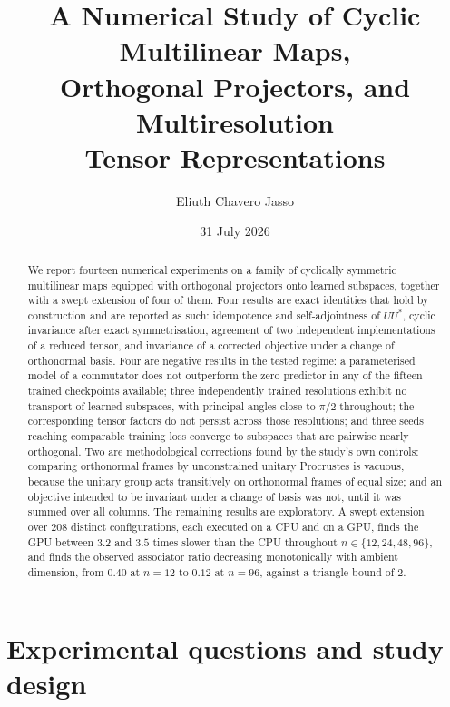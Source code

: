 \documentclass[11pt]{amsart}
\title[A numerical study of cyclic multilinear maps and projectors]{A Numerical Study of Cyclic Multilinear Maps,\\ Orthogonal Projectors, and Multiresolution\\ Tensor Representations}
\author{Eliuth Chavero Jasso}
\date{31 July 2026}
\theoremstyle{remark}
\begin{document}
\maketitle

\begin{abstract}
We report fourteen numerical experiments on a family of cyclically symmetric multilinear
maps equipped with orthogonal projectors onto learned subspaces, together with a swept
extension of four of them. Four results are exact identities that hold by construction and
are reported as such: idempotence and self-adjointness of $UU^{*}$, cyclic invariance
after exact symmetrisation, agreement of two independent implementations of a reduced
tensor, and invariance of a corrected objective under a change of orthonormal basis. Four
are negative results in the tested regime: a parameterised model of a commutator does not
outperform the zero predictor in any of the fifteen trained checkpoints available; three
independently trained resolutions exhibit no transport of learned subspaces, with
principal angles close to $\pi/2$ throughout; the corresponding tensor factors do not
persist across those resolutions; and three seeds reaching comparable training loss
converge to subspaces that are pairwise nearly orthogonal. Two are methodological
corrections found by the study's own controls: comparing orthonormal frames by
unconstrained unitary Procrustes is vacuous, because the unitary group acts transitively
on orthonormal frames of equal size; and an objective intended to be invariant under a
change of basis was not, until it was summed over all columns. The remaining results are
exploratory. A swept extension over $208$ distinct configurations, each executed on a CPU
and on a GPU, finds the GPU between $3.2$ and $3.5$ times slower than the CPU throughout
$n\in\{12,24,48,96\}$, and finds the observed associator ratio decreasing monotonically
with ambient dimension, from $0.40$ at $n=12$ to $0.12$ at $n=96$, against a triangle bound
of $2$.
\end{abstract}


\section{Experimental questions and study design}
\label{sec:design}
\end{document}
